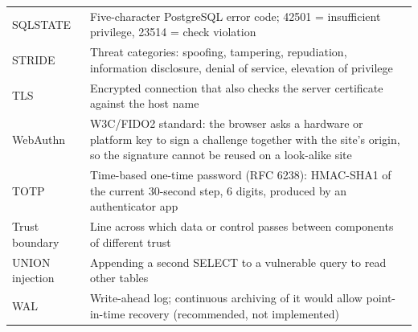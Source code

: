 \begin{center}
\begin{longtable}{@{}L{3.2cm}L{12.6cm}@{}}
SQLSTATE & Five-character PostgreSQL error code; 42501 = insufficient privilege, 23514 = check violation\\
STRIDE & Threat categories: spoofing, tampering, repudiation, information disclosure, denial of service, elevation of privilege\\
TLS  & Encrypted connection that also checks the server certificate against the host name\\
WebAuthn & W3C/FIDO2 standard: the browser asks a hardware or platform key to sign a challenge together with the site's origin, so the signature cannot be reused on a look-alike site\\
TOTP & Time-based one-time password (RFC 6238): HMAC-SHA1 of the current 30-second step, 6 digits, produced by an authenticator app\\
Trust boundary & Line across which data or control passes between components of different trust\\
UNION injection & Appending a second SELECT to a vulnerable query to read other tables\\
WAL & Write-ahead log; continuous archiving of it would allow point-in-time recovery (recommended, not implemented)\\
\bottomrule\end{longtable}\end{center}
